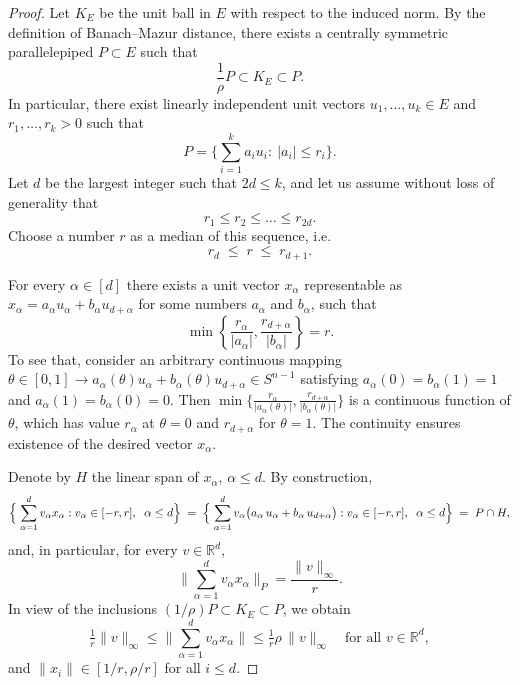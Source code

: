 \documentclass[11pt]{amsart}
\theoremstyle{definition}
\theoremstyle{plain}
\newcommand{\R}{\mathbb{R}}
\def\R{{\mathbb R}}
\begin{document}
\begin{proof}
  Let $K_E$ be the unit ball in $E$ with respect to the induced norm.
  By the definition of Banach--Mazur distance, there exists a centrally
  symmetric parallelepiped $P\subset E$ such that
  \[
  \frac{1}{\rho}P\subset K_E\subset P.
  \]
  In particular, there exist linearly independent unit vectors $u_1,\dots,u_k\in E$ and $r_1,\dots,r_k>0$
  such that
  $$
    P = \Big\{\sum_{i=1}^k a_i u_i:\ |a_i|\le r_i\Big\}.
  $$
  Let $d$ be the largest integer such that $2d \le k$, and let us assume without loss of generality that  
\[
  r_1 \le r_2 \le \dots \le r_{2d}.
\]
Choose a number \(r\) as a median of this sequence, i.e.\
\[
  r_{d} \;\le\; r \;\le\; r_{d+ 1}.
\]


For every \(\alpha\in[d]\) there exists a unit vector $x_\alpha$
representable as $x_\alpha = a_\alpha u_\alpha + b_\alpha u_{d+\alpha}$
for some numbers $a_\alpha$ and $b_\alpha$, such that 
$$
    \min \left\{ \frac{r_\alpha}{|a_\alpha|}, \frac{r_{d+\alpha}}{|b_\alpha|} \right\} = r.
$$
To see that, consider an arbitrary continuous mapping $\theta\in[0,1]\to a_\alpha(\theta) u_\alpha + b_\alpha(\theta)u_{d+\alpha}\in S^{n-1}$
satisfying $a_\alpha(0)=b_\alpha(1)=1$ and $a_\alpha(1)=b_\alpha(0)=0$.
Then $\min \big\{ \frac{r_\alpha}{|a_\alpha(\theta)|}, \frac{r_{d+\alpha}}{|b_\alpha(\theta)|} \big\}$ is a continuous function of $\theta$, which has value $r_\alpha$ at $\theta=0$ and $r_{d+\alpha}$ for $\theta=1$. The continuity ensures
existence of the desired vector $x_\alpha$.  

Denote by $H$ the linear span of $x_\alpha$, $\alpha\leq d$.
By construction,
\[
  \Bigl\{\;\sum_{\alpha=1}^{d} v_\alpha x_\alpha
         : v_\alpha\in[-r,r],\;\;\alpha\leq d\Bigr\}
  \;=\;
  \Bigl\{\;\sum_{\alpha=1}^{d} v_\alpha
            \bigl(a_\alpha\,u_\alpha
                  +b_\alpha\,u_{d+\alpha}\bigr)
         : v_\alpha\in[-r,r],\;\;\alpha\leq d\Bigr\}
  \;=\;
  P \cap H,
\]
and, in particular, for every $v\in \R^d$,
$$
  \Big\| \sum_{\alpha=1}^{d} v_\alpha x_\alpha\Big\|_P = \frac{\|v\|_\infty}{r}.
$$
  In view of the inclusions $(1/\rho)P\subset K_E\subset P$, we obtain
  \[
  \tfrac{1}{r}\|v\|_\infty
  \le
  \Big\|\sum_{\alpha=1}^{d} v_\alpha x_\alpha\Big\|
  \le
  \tfrac{1}{r}\rho\,\|v\|_\infty
  \quad\text{for all }v\in\R^{d},
  \]
  and $\|x_i\|\in[1/r,\rho/r]$ for all $i\le d$.


\end{proof}
\end{document}
